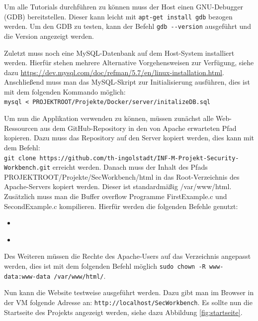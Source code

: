 Um alle Tutorials durchführen zu können muss der Host einen GNU-Debugger (GDB) bereitstellen. Dieser kann leicht mit  \colorbox{altgray}{\lstinline|apt-get install gdb|} bezogen werden. Um den GDB zu testen, kann der Befehl \colorbox{altgray}{\lstinline|gdb --version|} ausgeführt und die Version angezeigt werden.\medskip

Zuletzt muss noch eine MySQL-Datenbank auf dem Host-System installiert werden. Hierfür stehen mehrere Alternative Vorgehensweisen zur Verfügung, siehe dazu \url{https://dev.mysql.com/doc/refman/5.7/en/linux-installation.html}. Anschließend muss man das MySQL-Skript zur Initialisierung ausführen, dies ist mit dem folgenden Kommando möglich:\\ \colorbox{altgray}{\lstinline|mysql < PROJEKTROOT/Projekte/Docker/server/initalizeDB.sql|} \medskip

Um nun die Applikation verwenden zu können, müssen zunächst alle Web-Ressourcen aus dem GitHub-Repository in den von Apache erwarteten Pfad kopieren. Dazu muss das Repository auf den Server kopiert werden, dies kann mit dem Befehl:\\ \colorbox{altgray}{\lstinline|git clone https://github.com/th-ingolstadt/INF-M-Projekt-Security-Workbench.git|} erreicht werden. Danach muss der Inhalt des Pfads PROJEKTROOT/Projekte/SecWorkbench/html in das Root-Verzeichnis des Apache-Servers kopiert werden. Dieser ist standardmäßig /var/www/html. Zusätzlich muss man die Buffer overflow Programme FirstExample.c und SecondExample.c kompilieren. Hierfür werden die folgenden Befehle genutzt:

\begin{itemize}
	\item {}\\ 
	\item {}\\ 
\end{itemize}

Des Weiteren müssen die Rechte des Apache-Users auf das Verzeichnis angepasst werden, dies ist mit dem folgenden Befehl möglich \colorbox{altgray}{\lstinline|sudo chown -R www-data:www-data /var/www/html/|}.\medskip

Nun kann die Website testweise ausgeführt werden. Dazu gibt man im Browser in der VM folgende Adresse an:  \colorbox{altgray}{\lstinline|http://localhost/SecWorkbench|}. Es sollte nun die Startseite des Projekts angezeigt werden, siehe dazu Abbildung \ref{fig:startseite}.

